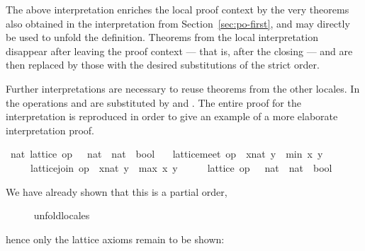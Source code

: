 \begin{isabellebody}
\begin{isamarkuptext}
  The above interpretation enriches the local proof context by
  the very theorems also obtained in the interpretation from
  Section~\ref{sec:po-first}, and  may directly be
  used to unfold the definition.  Theorems from the local
  interpretation disappear after leaving the proof context --- that
  is, after the closing  --- and are
  then replaced by those with the desired substitutions of the strict
  order.%
\end{isamarkuptext}%
\isamarkuptrue%
%
\isamarkuptrue%
%
\begin{isamarkuptext}%
Further interpretations are necessary to reuse theorems from
  the other locales.  In  the operations \isa{{\isasymsqinter}} and
  \isa{{\isasymsqunion}} are substituted by  and
  .  The entire proof for the
  interpretation is reproduced in order to give an example of a more
  elaborate interpretation proof.%
\end{isamarkuptext}%
\isamarkuptrue%
%
\isadelimvisible
%
\endisadelimvisible
%
\isatagvisible
{}\isamarkupfalse%
\ nat{\isacharbang}{\isacharcolon}\ lattice\ {\isachardoublequoteopen}op\ {\isasymle}\ {\isacharcolon}{\isacharcolon}\ nat\ {\isasymRightarrow}\ nat\ {\isasymRightarrow}\ bool{\isachardoublequoteclose}\isanewline
\ \ \ {\isachardoublequoteopen}lattice{\isachardot}meet\ op\ {\isasymle}\ {\isacharparenleft}x{\isacharcolon}{\isacharcolon}nat{\isacharparenright}\ y\ {\isacharequal}\ min\ x\ y{\isachardoublequoteclose}\isanewline
\ \ \ \ \ {\isachardoublequoteopen}lattice{\isachardot}join\ op\ {\isasymle}\ {\isacharparenleft}x{\isacharcolon}{\isacharcolon}nat{\isacharparenright}\ y\ {\isacharequal}\ max\ x\ y{\isachardoublequoteclose}\isanewline
{}\isamarkupfalse%
\ {\isacharminus}\isanewline
\ \ \isamarkupfalse%
\ {\isachardoublequoteopen}lattice\ {\isacharparenleft}op\ {\isasymle}\ {\isacharcolon}{\isacharcolon}\ nat\ {\isasymRightarrow}\ nat\ {\isasymRightarrow}\ bool{\isacharparenright}{\isachardoublequoteclose}%
\begin{isamarkuptxt}%
We have already shown that this is a partial order,%
\end{isamarkuptxt}%
\isamarkuptrue%
\ \ \ \ \isamarkupfalse%
\ unfold{\isacharunderscore}locales%
\begin{isamarkuptxt}%
hence only the lattice axioms remain to be shown: \begin{isabelle}%

\end{isabelle}
\end{isamarkuptxt}
\end{isabellebody}
